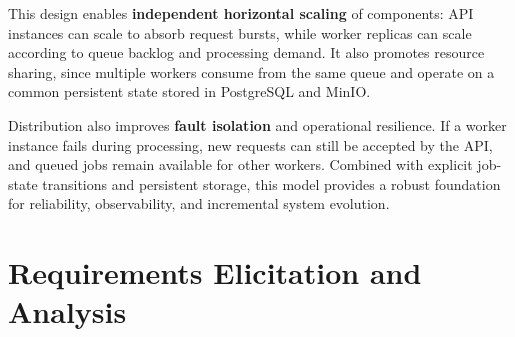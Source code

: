 \documentclass{scrartcl}
\begin{document}
This design enables \textbf{independent horizontal scaling} of components: API instances can scale to absorb request bursts, while worker replicas can scale according to queue backlog and processing demand.
It also promotes resource sharing, since multiple workers consume from the same queue and operate on a common persistent state stored in PostgreSQL and MinIO.

Distribution also improves \textbf{fault isolation} and operational resilience.
If a worker instance fails during processing, new requests can still be accepted by the API, and queued jobs remain available for other workers.
Combined with explicit job-state transitions and persistent storage, this model provides a robust foundation for reliability, observability, and incremental system evolution.

\section{Requirements Elicitation and Analysis}\label{requirements}





\end{document}
